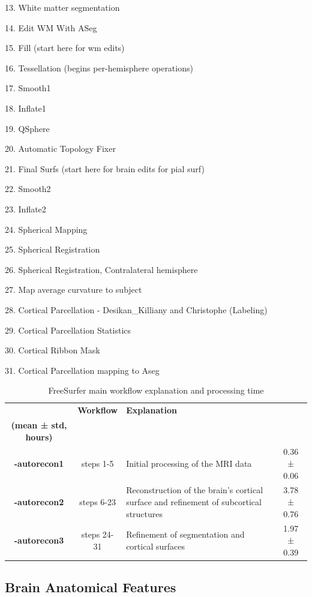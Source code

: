 \documentclass[pdflatex,sn-nature]{sn-jnl}%
\theoremstyle{thmstyleone}%
\theoremstyle{thmstyletwo}%
\theoremstyle{thmstylethree}%
\begin{document}
\begin{appendices}
13. White matter segmentation

14. Edit WM With ASeg

15. Fill (start here for wm edits)

16. Tessellation (begins per-hemisphere operations)

17. Smooth1

18. Inflate1

19. QSphere

20. Automatic Topology Fixer

21. Final Surfs (start here for brain edits for pial surf)

22. Smooth2

23. Inflate2

24. Spherical Mapping

25. Spherical Registration

26. Spherical Registration, Contralateral hemisphere

27. Map average curvature to subject

28. Cortical Parcellation - Desikan\_Killiany and Christophe (Labeling)

29. Cortical Parcellation Statistics

30. Cortical Ribbon Mask

31. Cortical Parcellation mapping to Aseg

\begin{table}[ht]
\centering
\begin{tabular}{c|c|p{5cm}|c}
\hline
 & \textbf{Workflow} & \textbf{Explanation} & \makecell{ \textbf{Time} \\\textbf{(mean ± std, hours)}} \\
\hline
\textbf{-autorecon1} & steps 1-5 & Initial processing of the MRI data & 0.36 ± 0.06 \\
\hline
\textbf{-autorecon2} & steps 6-23 & Reconstruction of the brain’s cortical surface and refinement of subcortical structures & 3.78 ± 0.76 \\
\hline
\textbf{-autorecon3} & steps 24-31 & Refinement of segmentation and cortical surfaces & 1.97 ± 0.39 \\
\hline
\end{tabular}
\caption{FreeSurfer main workflow explanation and processing time}
\label{tab:fs_workflow}
\end{table}


\clearpage
\subsection{Brain Anatomical Features}
\label{sec:brain_anatomical_features}


\end{appendices}
\end{document}
